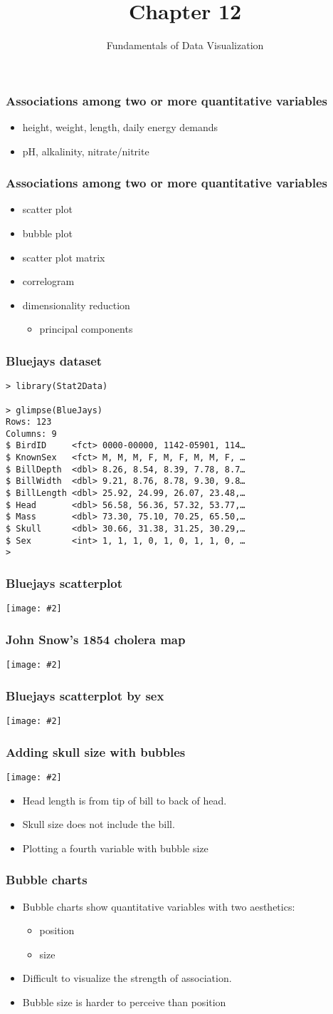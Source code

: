 \documentclass{beamer}
\author{Fundamentals of Data Visualization}
\title{Chapter 12}
\newcommand{\bi}{\begin{itemize}}
\newcommand{\li}{\item}
\newcommand{\ei}{\end{itemize}}
\newcommand{\fig}[2]{\centerline{\texttt{[image: \#2]}}}
\newcommand{\bfr}[1]{\begin{frame}[fragile]\frametitle{{ #1 }}}
\begin{document}
\begin{frame}
\maketitle
\end{frame}

\bfr{Associations among two or more quantitative variables}
\bi
\li height, weight, length, daily energy demands
\li pH, alkalinity, nitrate/nitrite
\ei

\end{frame}
\bfr{Associations among two or more quantitative variables}
\bi
\li scatter plot
\li bubble plot
\li scatter plot matrix
\li correlogram
\li dimensionality reduction
\bi\li principal components\ei

\ei

\end{frame}

\bfr{Bluejays dataset}
\begin{verbatim}
> library(Stat2Data)

> glimpse(BlueJays)
Rows: 123
Columns: 9
$ BirdID     <fct> 0000-00000, 1142-05901, 114…
$ KnownSex   <fct> M, M, M, F, M, F, M, M, F, …
$ BillDepth  <dbl> 8.26, 8.54, 8.39, 7.78, 8.7…
$ BillWidth  <dbl> 9.21, 8.76, 8.78, 9.30, 9.8…
$ BillLength <dbl> 25.92, 24.99, 26.07, 23.48,…
$ Head       <dbl> 56.58, 56.36, 57.32, 53.77,…
$ Mass       <dbl> 73.30, 75.10, 70.25, 65.50,…
$ Skull      <dbl> 30.66, 31.38, 31.25, 30.29,…
$ Sex        <int> 1, 1, 1, 0, 1, 0, 1, 1, 0, …
> 
\end{verbatim}
\end{frame}
\bfr{Bluejays scatterplot}
\fig{.8}{blue-jays-scatter-1.png}
\end{frame}
\bfr{John Snow's 1854 cholera map}
\fig{.9}{snow-cholera-map.jpg}
\end{frame}
\bfr{Bluejays scatterplot by sex}
\fig{.8}{blue-jays-scatter-sex-1.png}
\end{frame}
\bfr{Adding skull size with bubbles}
\fig{1}{blue-jays-scatter-bubbles-1.png}
\bi
\li Head length is from tip of bill to back of head.
\li Skull size does not include the bill.
\li Plotting a fourth variable with bubble size
\ei
\end{frame}

\bfr{Bubble charts}
\bi
\li Bubble charts show quantitative variables with two aesthetics:%
\bi\li position \li size\ei
\li Difficult to visualize the strength of association.
\li Bubble size is harder to perceive than position
\ei
\end{frame}
\end{document}
